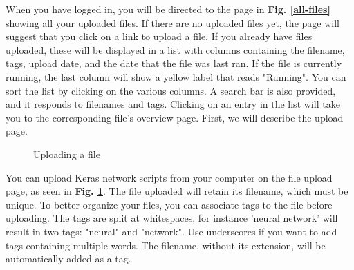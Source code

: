 \noindent When you have logged in, you will be directed to the page in \textbf{Fig. \ref{all-files}} showing all your uploaded files. If there are no uploaded files yet, the page will suggest that you click on a link to upload a file. If you already have files uploaded, these will be displayed in a list with columns containing the filename, tags, upload date, and the date that the file was last ran. If the file is currently running, the last column will show a yellow label that reads "Running". You can sort the list by clicking on the various columns. A search bar is also provided, and it responds to filenames and tags. Clicking on an entry in the list will take you to the corresponding file's overview page. First, we will describe the upload page. \\


\begin{figure}[h!]
    \centering
        \caption{Uploading a file}
        \label{upload-file}
\end{figure}

\noindent You can upload Keras network scripts from your computer on the file upload page, as seen in \textbf{Fig. \ref{upload-file}}. The file uploaded will retain its filename, which must be unique. To better organize your files, you can associate tags to the file before uploading. The tags are split at whitespaces, for instance 'neural network' will result in two tags: "neural" and "network". Use underscores if you want to add tags containing multiple words. The filename, without its extension, will be automatically added as a tag. \\

